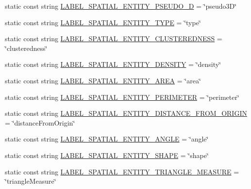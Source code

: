 \begin{DoxyCompactItemize}
\item 
static const string \hyperlink{classmultiscale_1_1analysis_1_1Detector_afc891454d41c2ede5e4b3155798045c4}{L\-A\-B\-E\-L\-\_\-\-S\-P\-A\-T\-I\-A\-L\-\_\-\-E\-N\-T\-I\-T\-Y\-\_\-\-P\-S\-E\-U\-D\-O\-\_\-D} = \char`\"{}pseudo3\-D\char`\"{}
\item 
static const string \hyperlink{classmultiscale_1_1analysis_1_1Detector_ac93f1fd6bdc7250b890480c7d5acf5b0}{L\-A\-B\-E\-L\-\_\-\-S\-P\-A\-T\-I\-A\-L\-\_\-\-E\-N\-T\-I\-T\-Y\-\_\-\-T\-Y\-P\-E} = \char`\"{}type\char`\"{}
\item 
static const string \hyperlink{classmultiscale_1_1analysis_1_1Detector_adae62b15a836592fd35057cf037730d8}{L\-A\-B\-E\-L\-\_\-\-S\-P\-A\-T\-I\-A\-L\-\_\-\-E\-N\-T\-I\-T\-Y\-\_\-\-C\-L\-U\-S\-T\-E\-R\-E\-D\-N\-E\-S\-S} = \char`\"{}clusteredness\char`\"{}
\item 
static const string \hyperlink{classmultiscale_1_1analysis_1_1Detector_ab4f91117dab09a9356422d839aba811f}{L\-A\-B\-E\-L\-\_\-\-S\-P\-A\-T\-I\-A\-L\-\_\-\-E\-N\-T\-I\-T\-Y\-\_\-\-D\-E\-N\-S\-I\-T\-Y} = \char`\"{}density\char`\"{}
\item 
static const string \hyperlink{classmultiscale_1_1analysis_1_1Detector_a163a0858c9d71d9ddac78f814d48bee6}{L\-A\-B\-E\-L\-\_\-\-S\-P\-A\-T\-I\-A\-L\-\_\-\-E\-N\-T\-I\-T\-Y\-\_\-\-A\-R\-E\-A} = \char`\"{}area\char`\"{}
\item 
static const string \hyperlink{classmultiscale_1_1analysis_1_1Detector_adc07a468da3a48acbb858c6a8de7dec2}{L\-A\-B\-E\-L\-\_\-\-S\-P\-A\-T\-I\-A\-L\-\_\-\-E\-N\-T\-I\-T\-Y\-\_\-\-P\-E\-R\-I\-M\-E\-T\-E\-R} = \char`\"{}perimeter\char`\"{}
\item 
static const string \hyperlink{classmultiscale_1_1analysis_1_1Detector_a58a41d2e2ccdbf3c760823d51ce9b0fe}{L\-A\-B\-E\-L\-\_\-\-S\-P\-A\-T\-I\-A\-L\-\_\-\-E\-N\-T\-I\-T\-Y\-\_\-\-D\-I\-S\-T\-A\-N\-C\-E\-\_\-\-F\-R\-O\-M\-\_\-\-O\-R\-I\-G\-I\-N} = \char`\"{}distance\-From\-Origin\char`\"{}
\item 
static const string \hyperlink{classmultiscale_1_1analysis_1_1Detector_a8d4353995ad98cc8349698aa6034bb79}{L\-A\-B\-E\-L\-\_\-\-S\-P\-A\-T\-I\-A\-L\-\_\-\-E\-N\-T\-I\-T\-Y\-\_\-\-A\-N\-G\-L\-E} = \char`\"{}angle\char`\"{}
\item 
static const string \hyperlink{classmultiscale_1_1analysis_1_1Detector_ae824ff121054358172ebf21aab8a8b46}{L\-A\-B\-E\-L\-\_\-\-S\-P\-A\-T\-I\-A\-L\-\_\-\-E\-N\-T\-I\-T\-Y\-\_\-\-S\-H\-A\-P\-E} = \char`\"{}shape\char`\"{}
\item 
static const string \hyperlink{classmultiscale_1_1analysis_1_1Detector_a7776a488915b9d47f678d87161c0478f}{L\-A\-B\-E\-L\-\_\-\-S\-P\-A\-T\-I\-A\-L\-\_\-\-E\-N\-T\-I\-T\-Y\-\_\-\-T\-R\-I\-A\-N\-G\-L\-E\-\_\-\-M\-E\-A\-S\-U\-R\-E} = \char`\"{}triangle\-Measure\char`\"{}

\end{DoxyCompactItemize}
